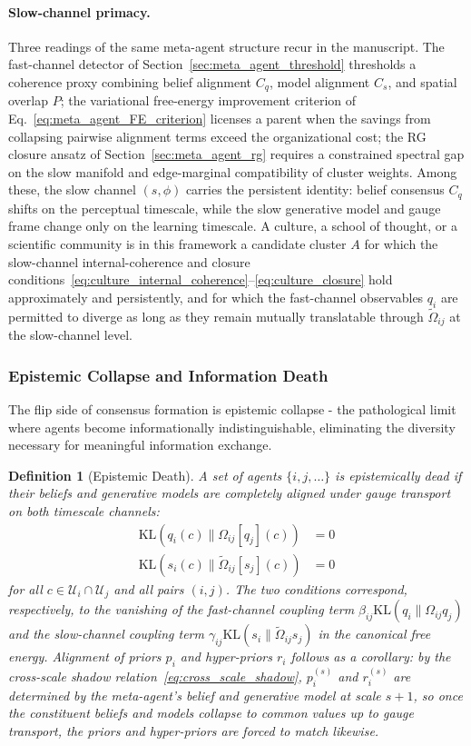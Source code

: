 \documentclass[11pt]{article}
\newtheorem{definition}{Definition}
\begin{document}
\paragraph{Slow-channel primacy.}
Three readings of the same meta-agent structure recur in the manuscript. The fast-channel detector of Section~\ref{sec:meta_agent_threshold} thresholds a coherence proxy combining belief alignment $C_q$, model alignment $C_s$, and spatial overlap $P$; the variational free-energy improvement criterion of Eq.~\eqref{eq:meta_agent_FE_criterion} licenses a parent when the savings from collapsing pairwise alignment terms exceed the organizational cost; the RG closure ansatz of Section~\ref{sec:meta_agent_rg} requires a constrained spectral gap on the slow manifold and edge-marginal compatibility of cluster weights. Among these, the slow channel $(s, \phi)$ carries the persistent identity: belief consensus $C_q$ shifts on the perceptual timescale, while the slow generative model and gauge frame change only on the learning timescale. A culture, a school of thought, or a scientific community is in this framework a candidate cluster $A$ for which the slow-channel internal-coherence and closure conditions~\eqref{eq:culture_internal_coherence}--\eqref{eq:culture_closure} hold approximately and persistently, and for which the fast-channel observables $q_i$ are permitted to diverge as long as they remain mutually translatable through $\tilde\Omega_{ij}$ at the slow-channel level.

\subsubsection{Epistemic Collapse and Information Death}
\label{sec:epistemic_collapse}

The flip side of consensus formation is epistemic collapse - the pathological limit where agents become informationally indistinguishable, eliminating the diversity necessary for meaningful information exchange.

\begin{definition}[Epistemic Death]
A set of agents $\{i, j, \ldots\}$ is epistemically dead if their beliefs and generative models are completely aligned under gauge transport on both timescale channels:
\begin{align}
\mathrm{KL}(q_i(c) \| \Omega_{ij}[q_j](c)) &= 0 \\
\mathrm{KL}(s_i(c) \| \tilde{\Omega}_{ij}[s_j](c)) &= 0
\end{align}
for all $c \in \mathcal{U}_i \cap \mathcal{U}_j$ and all pairs $(i,j)$. The two conditions correspond, respectively, to the vanishing of the fast-channel coupling term $\beta_{ij}\mathrm{KL}(q_i \| \Omega_{ij}q_j)$ and the slow-channel coupling term $\gamma_{ij}\mathrm{KL}(s_i \| \tilde{\Omega}_{ij}s_j)$ in the canonical free energy. Alignment of priors $p_i$ and hyper-priors $r_i$ follows as a corollary: by the cross-scale shadow relation~\eqref{eq:cross_scale_shadow}, $p_i^{(s)}$ and $r_i^{(s)}$ are determined by the meta-agent's belief and generative model at scale $s+1$, so once the constituent beliefs and models collapse to common values up to gauge transport, the priors and hyper-priors are forced to match likewise.
\end{definition}
\end{document}

